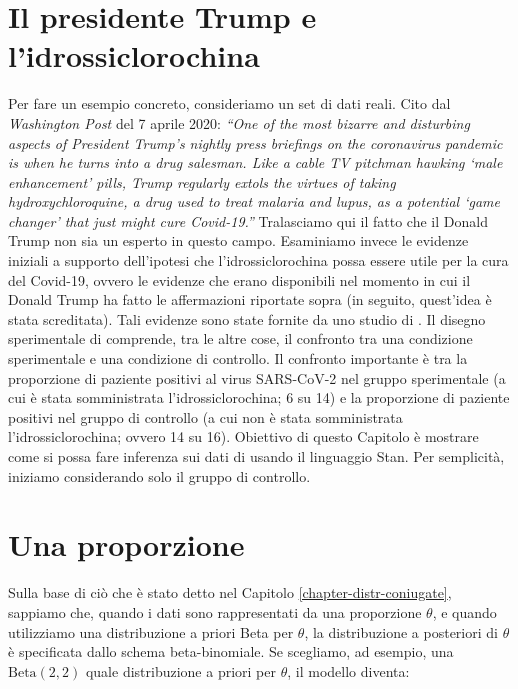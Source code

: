 \documentclass[
  11pt,
]{krantz}
\theoremstyle{definition}
\theoremstyle{definition}
\theoremstyle{definition}
\theoremstyle{definition}
\theoremstyle{remark}
\begin{document}
\hypertarget{il-presidente-trump-e-lidrossiclorochina}{%
\section{Il presidente Trump e l'idrossiclorochina}\label{il-presidente-trump-e-lidrossiclorochina}}

Per fare un esempio concreto, consideriamo un set di dati reali. Cito dal \emph{Washington Post} del 7 aprile 2020: \emph{``One of the most bizarre and disturbing aspects of President Trump's nightly press briefings on the coronavirus pandemic is when he turns into a drug salesman. Like a cable TV pitchman hawking `male enhancement' pills, Trump regularly extols the virtues of taking hydroxychloroquine, a drug used to treat malaria and lupus, as a potential `game changer' that just might cure Covid-19.''} Tralasciamo qui il fatto che il Donald Trump non sia un esperto in questo campo. Esaminiamo invece le evidenze iniziali a supporto dell'ipotesi che l'idrossiclorochina possa essere utile per la cura del Covid-19, ovvero le evidenze che erano disponibili nel momento in cui il Donald Trump ha fatto le affermazioni riportate sopra (in seguito, quest'idea è stata screditata). Tali evidenze sono state fornite da uno studio di \citet{Gautret_2020}. Il disegno sperimentale di \citet{Gautret_2020} comprende, tra le altre cose, il confronto tra una condizione sperimentale e una condizione di controllo. Il confronto importante è tra la proporzione di paziente positivi al virus SARS-CoV-2 nel gruppo sperimentale (a cui è stata somministrata l'idrossiclorochina; 6 su 14) e la proporzione di paziente positivi nel gruppo di controllo (a cui non è stata somministrata l'idrossiclorochina; ovvero 14 su 16). Obiettivo di questo Capitolo è mostrare come si possa fare inferenza sui dati di \citet{Gautret_2020} usando il linguaggio Stan. Per semplicità, iniziamo considerando solo il gruppo di controllo.

\hypertarget{una-proporzione}{%
\section{Una proporzione}\label{una-proporzione}}

Sulla base di ciò che è stato detto nel Capitolo \ref{chapter-distr-coniugate}, sappiamo che, quando i dati sono rappresentati da una proporzione \(\theta\), e quando utilizziamo una distribuzione a priori Beta per \(\theta\), la distribuzione a posteriori di \(\theta\) è specificata dallo schema beta-binomiale. Se scegliamo, ad esempio, una \(\mbox{Beta}(2, 2)\) quale distribuzione a priori per \(\theta\), il modello diventa:
\end{document}
